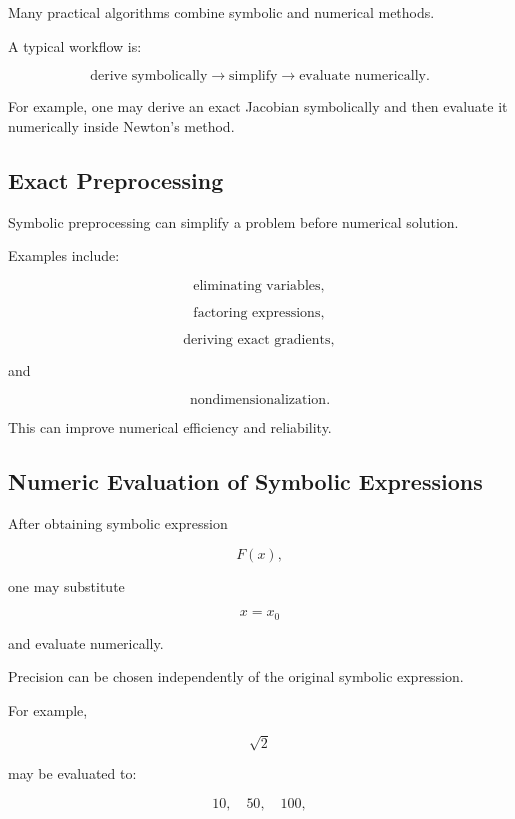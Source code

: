 Many practical algorithms combine symbolic and numerical methods.

A typical workflow is:

\[
\boxed{
\text{derive symbolically}
\rightarrow
\text{simplify}
\rightarrow
\text{evaluate numerically}.
}
\]

For example, one may derive an exact Jacobian symbolically and then
evaluate it numerically inside Newton's method.

\subsection{Exact Preprocessing}
\label{subsec:exact-preprocessing}

Symbolic preprocessing can simplify a problem before numerical solution.

Examples include:

\[
\boxed{
\text{eliminating variables},
}
\]

\[
\boxed{
\text{factoring expressions},
}
\]

\[
\boxed{
\text{deriving exact gradients},
}
\]

and

\[
\boxed{
\text{nondimensionalization}.
}
\]

This can improve numerical efficiency and reliability.

\subsection{Numeric Evaluation of Symbolic Expressions}
\label{subsec:numeric-evaluation-symbolic}

After obtaining symbolic expression

\[
F(x),
\]

one may substitute

\[
x=x_0
\]

and evaluate numerically.

Precision can be chosen independently of the original symbolic expression.

For example,

\[
\sqrt{2}
\]

may be evaluated to:

\[
\boxed{
10,
\quad
50,
\quad
100,
}
\]

